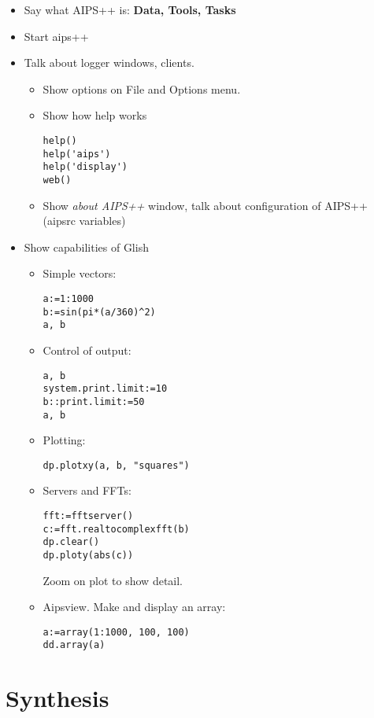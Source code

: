 \begin{itemize}
\item Say what AIPS++ is: {\bf Data, Tools, Tasks}
\item Start aips++
\item Talk about logger windows, clients. 
\begin{itemize}
\item Show options on File and Options menu. 
\item Show how help works
\begin{verbatim}
help()
help('aips')
help('display')
web()
\end{verbatim}
\item Show {\em about AIPS++} window, talk about configuration of
AIPS++ (aipsrc variables)
\end{itemize}
\item Show capabilities of Glish
\begin{itemize}
\item Simple vectors: 
\begin{verbatim}
a:=1:1000
b:=sin(pi*(a/360)^2)
a, b
\end{verbatim}
\item Control of output:
\begin{verbatim}
a, b
system.print.limit:=10
b::print.limit:=50
a, b
\end{verbatim}
\item Plotting: 
\begin{verbatim}
dp.plotxy(a, b, "squares")
\end{verbatim}
\item Servers and FFTs:
\begin{verbatim}
fft:=fftserver()
c:=fft.realtocomplexfft(b)
dp.clear()
dp.ploty(abs(c))
\end{verbatim}
Zoom on plot to show detail.
\item Aipsview. Make and display an array:
\begin{verbatim}
a:=array(1:1000, 100, 100)
dd.array(a)
\end{verbatim}
\end{itemize}
\end{itemize}

\section{Synthesis}

